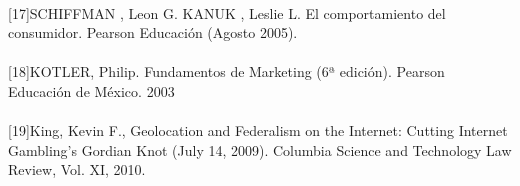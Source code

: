 \paragraph{}
[17]SCHIFFMAN , Leon G. KANUK , Leslie L. El comportamiento del consumidor. Pearson Educaci\'on (Agosto 2005).
\paragraph{}
[18]KOTLER, Philip.  Fundamentos de Marketing (6ª edici\'on). Pearson Educaci\'on de M\'exico. 2003
\paragraph{}
[19]King, Kevin F., Geolocation and Federalism on the Internet: Cutting Internet Gambling’s Gordian Knot (July 14, 2009). Columbia Science and Technology Law Review, Vol. XI, 2010.
\pagebreak